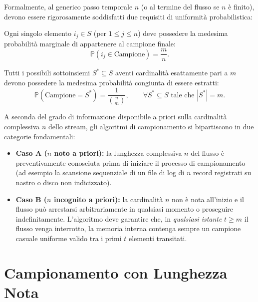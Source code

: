 Formalmente, al generico passo temporale $n$ (o al termine del flusso se $n$ è finito), devono essere rigorosamente soddisfatti due requisiti di uniformità probabilistica:

\begin{definition}
Ogni singolo elemento $i_j \in S$ (per $1 \le j \le n$) deve possedere la medesima probabilità marginale di appartenere al campione finale:
\begin{equation}
  \mathbb{P}(i_j \in \text{Campione}) = \frac{m}{n}.
  \label{eq:marginal-uniformity}
\end{equation}
\end{definition}

\begin{definition}
Tutti i possibili sottoinsiemi $S^* \subseteq S$ aventi cardinalità esattamente pari a $m$ devono possedere la medesima probabilità congiunta di essere estratti:
\begin{equation}
  \mathbb{P}(\text{Campione} = S^*) = \frac{1}{\binom{n}{m}}, \qquad \forall S^* \subseteq S \text{ tale che } |S^*| = m.
  \label{eq:joint-uniformity}
\end{equation}
\end{definition}

A seconda del grado di informazione disponibile a priori sulla cardinalità complessiva $n$ dello stream, gli algoritmi di campionamento si bipartiscono in due categorie fondamentali:
\begin{itemize}
  \item \textbf{Caso A ($n$ noto a priori):} la lunghezza complessiva $n$ del flusso è preventivamente conosciuta prima di iniziare il processo di campionamento (ad esempio la scansione sequenziale di un file di log di $n$ record registrati su nastro o disco non indicizzato).
  \item \textbf{Caso B ($n$ incognito a priori):} la cardinalità $n$ non è nota all'inizio e il flusso può arrestarsi arbitrariamente in qualsiasi momento o proseguire indefinitamente. L'algoritmo deve garantire che, in \emph{qualsiasi istante} $t \ge m$ il flusso venga interrotto, la memoria interna contenga sempre un campione casuale uniforme valido tra i primi $t$ elementi transitati.
\end{itemize}

\FloatBarrier
\section{Campionamento con Lunghezza Nota}
\label{sec:sampling-known-n}

